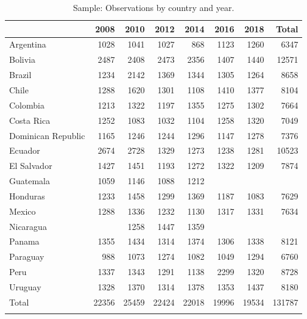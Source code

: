 \documentclass[utf8]{frontiers_suppmat1} %
\begin{document}
\onecolumn
{}

\title[Supplementary Material]{{}}

\maketitle



\begin{table}[h]
\centering
	\caption{Sample: Observations by country and year.}
	\label{appendix1}
	\renewcommand{\arraystretch}{0.8}
    \begin{tabular}{lrrrrrrr}
     \toprule
     & 2008 & 2010 & 2012 & 2014 & 2016 & 2018 & Total \\
		\midrule
		Argentina & 1028 & 1041 & 1027 & 868 & 1123 & 1260 & 6347 \\
		Bolivia & 2487 & 2408 & 2473 & 2356 & 1407 & 1440 & 12571 \\
		Brazil & 1234 & 2142 & 1369 & 1344 & 1305 & 1264 & 8658 \\
		Chile & 1288 & 1620 & 1301 & 1108 & 1410 & 1377 & 8104 \\
		Colombia & 1213 & 1322 & 1197 & 1355 & 1275 & 1302 & 7664 \\
		Costa Rica & 1252 & 1083 & 1032 & 1104 & 1258 & 1320 & 7049 \\
		Dominican Republic & 1165 & 1246 & 1244 & 1296 & 1147 & 1278 & 7376 \\
		Ecuador & 2674 & 2728 & 1329 & 1273 & 1238 & 1281 & 10523 \\
		El Salvador & 1427 & 1451 & 1193 & 1272 & 1322 & 1209 & 7874 \\
		Guatemala & 1059 & 1146 & 1088 & 1212 &  &  &  \\
		Honduras & 1233 & 1458 & 1299 & 1369 & 1187 & 1083 & 7629 \\
		Mexico & 1288 & 1336 & 1232 & 1130 & 1317 & 1331 & 7634 \\
		Nicaragua &  & 1258 & 1447 & 1359 &  &  &  \\
		Panama & 1355 & 1434 & 1314 & 1374 & 1306 & 1338 & 8121 \\
		Paraguay & 988 & 1073 & 1274 & 1082 & 1049 & 1294 & 6760 \\
		Peru & 1337 & 1343 & 1291 & 1138 & 2299 & 1320 & 8728 \\
		Uruguay & 1328 & 1370 & 1314 & 1378 & 1353 & 1437 & 8180 \\
		\midrule
		Total & 22356 & 25459 & 22424 & 22018 & 19996 & 19534 & 131787 \\
		\botrule
	\end{tabular}
\end{table}
\end{document}
